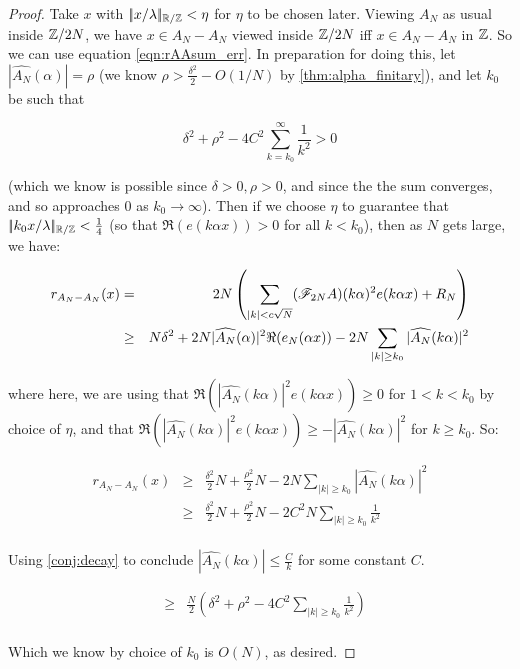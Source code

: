 \documentclass{report}
\theoremstyle{remark}
\numberwithin{equation}{section}
\begin{document}
\begin{proof}
  Take $x$ with $|\!|x/\lambda|\!|_{\mathbb{R}/\mathbb{Z}} < \eta$ for $\eta$ to be chosen
  later.  Viewing $A_N$ as usual inside $\mathbb{Z}/2N$, we have
  $x \in A_N - A_N$ viewed inside $\mathbb{Z}/2N$ iff $x \in A_N - A_N$ in
  $\mathbb{Z}$.  So we can use equation \ref{eqn:rAAsum_err}.  In preparation
  for doing this, let $|\widehat{A_N}(\alpha)| = \rho$ (we know
  $\rho > \frac{\delta^2}{2} - O(1/N)$ by \ref{thm:alpha_finitary}),
  and let $k_0$ be such that

  \[\delta^2 + \rho^2 - 4 C^2 \sum_{k=k_0}^\infty \frac{1}{k^2} > 0\]

  (which we know is possible since $\delta > 0, \rho > 0$, and since
  the the sum converges, and so approaches 0 as $k_0 \to \infty$).
  Then if we choose $\eta$ to guarantee that
  $|\!|k_0 x/\lambda|\!|_{\mathbb{R}/\mathbb{Z}} < \frac14$ (so that $\Re(e(k\alpha x)) > 0$
  for all $k < k_0$), then as $N$ gets large, we have:

  \begin{eqnarray*}
    r_{A_N - A_N}(x) &=& 2N \left(\sum_{|k| < c\sqrt{N}}
                       (\mathscr{F}_{2N}A)(k\alpha)^2 e(k\alpha x) + R_N\right)\\
                     &\geq& N \delta^2 + 2N
                            |\widehat{A_N}(\alpha)|^2
                            \Re(e_N(\alpha x)) - 2N \sum_{|k| \geq k_0}
                            |\widehat{A_N}(k\alpha)|^2\\
  \end{eqnarray*}

  where here, we are using that
  $\Re(|\widehat{A_N}(k\alpha)|^2 e(k\alpha x)) \geq 0$ for
  $1 < k < k_0$ by choice of $\eta$, and that
  $\Re(|\widehat{A_N}(k\alpha)|^2 e(k\alpha x)) \geq
  -|\widehat{A_N}(k\alpha)|^2$ for $k \geq k_0$.  So: 

  \begin{eqnarray*}
    r_{A_N - A_N}(x) &\geq& \frac{\delta^2}{2} N + \frac{\rho^2}{2} N
                            - 2N \sum_{|k| \geq k_0} |\widehat{A_N}(k\alpha)|^2\\
                     &\geq& \frac{\delta^2}{2} N + \frac{\rho^2}{2} N
                            - 2C^2 N \sum_{|k| \geq k_0}
                            \frac{1}{k^2}\\
  \end{eqnarray*}


  Using \ref{conj:decay} to conclude
  $|\widehat{A_N}(k\alpha)| \leq \frac{C}{k}$ for some constant $C$.

  \begin{eqnarray*}
    &\geq& \frac{N}{2}\left(\delta^2 + \rho^2 - 4C^2 \sum_{|k| \geq k_0} \frac{1}{k^2}\right)\\
  \end{eqnarray*}
  
  Which we know by choice of $k_0$ is $O(N)$, as desired.  

\end{proof}
\end{document}
